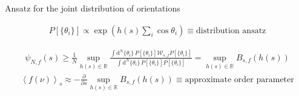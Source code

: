\documentclass{beamer}
\begin{document}
\begin{frame}{Ansatz for the joint distribution of orientations}

\begin{align*}
P[\{\theta_i\}] \propto \exp\left(h(s) \sum_i \cos\theta_i\right) \equiv \text{distribution ansatz}
\end{align*}

\return
\begin{align*}
\psi_{N, f}(s) \geq \frac{1}{N} \sup_{h(s) \in \mathbb{R}} \frac{\int \text{d}^N\{\theta_i\} \, P[\{\theta_i\}] \mathscr{W}_{s, f} P[\{\theta_i\}]}{\int \text{d}^N\{\theta_i\} \, P[\{\theta_i\}] P[\{\theta_i\}]} = \sup_{h(s) \in \mathbb{R}} B_{s,f}(h(s))
\end{align*}
\begin{align*}
\left<f(\nu)\right>_s \approx - \frac{\partial}{\partial s} \sup_{h(s) \in \mathbb{R}} B_{s,f}(h(s)) \equiv \text{approximate order parameter}
\end{align*}

\end{frame}
\end{document}
